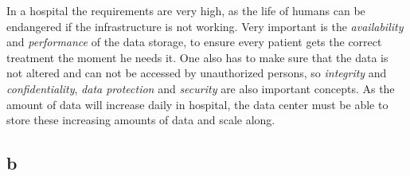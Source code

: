 \documentclass{article}
\begin{document}
	In a hospital the requirements are very high,
	as the life of humans can be endangered if the infrastructure is not working.
	Very important is the \emph{availability} and \emph{performance} of the data storage,
	to ensure every patient gets the correct treatment the moment he needs it.
	One also has to make sure that the data is not altered and can not be accessed by unauthorized persons,
	so \emph{integrity} and \emph{confidentiality}, \emph{data protection} and \emph{security} are also important concepts.
	As the amount of data will increase daily in hospital,
	the data center must be able to store these increasing amounts of data and scale along.

\subsection*{b}
\end{document}
